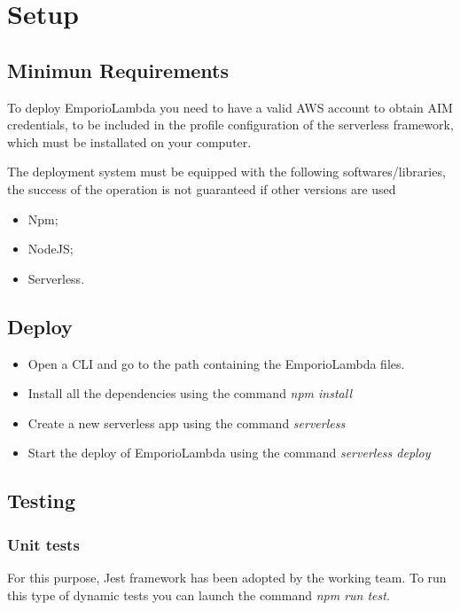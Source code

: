 \section{Setup} \label{_setup}

\subsection{Minimun Requirements}
To deploy EmporioLambda you need to have a valid AWS account to obtain AIM credentials, to be included in the profile configuration of 
the serverless framework, which must be installated on your computer.

The deployment system must be equipped with the following softwares/libraries, the success of the operation is not guaranteed if other versions are used


\begin{itemize}
    \item Npm;
    \item NodeJS;
    \item Serverless.
\end{itemize}

\subsection{Deploy}

\begin{itemize}
    \item Open a CLI and go to the path containing the EmporioLambda files.
    \item Install all the dependencies using the command \textit{npm install}
    \item Create a new serverless app using the command \textit{serverless}
    \item Start the deploy of EmporioLambda using the command \textit{serverless deploy}
\end{itemize}

\subsection{Testing}

\subsubsection{Unit tests}
For this purpose, Jest framework has been adopted by the working team. To run this type of dynamic tests
you can launch the command \textit{npm run test}.

